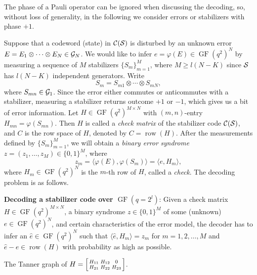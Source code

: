 \documentclass{ieeeaccess}
\DeclareMathOperator{\GF}{GF}
\DeclareMathOperator{\row}{row}
\newcommand{\sC}{{\cal C}}
\newcommand{\sG}{{\cal G}}
\newcommand{\sS}{{\cal S}}
\newcommand{\cS}{{\cal S}}
\let\emph\textit
\theoremstyle{definition}		%
\begin{document}
The phase of a Pauli operator can be ignored when discussing the decoding, so, without loss of generality, in the following we consider errors or stabilizers with phase $+1$.

Suppose that a codeword (state) in $\sC(\sS)$ is disturbed by an \mbox{unknown} error $E = E_1\otimes\cdots \otimes E_N\in\sG_N$.
We would like to infer $e = \varphi(E) \in\GF(q^2)^N$ by measuring 
a sequence of $M$ stabilizers  $\{S_m\}_{m=1}^M$, where $M\ge l(N-K)$ since $\cS$ has $l(N-K)$ independent generators. 
Write 
\begin{equation} \label{eq:S_m}
S_m = S_{m1} \otimes \cdots \otimes S_{mN},
\end{equation}
where $S_{mn}\in\sG_1$.
%
Since the error either commutes or anticommutes with a stabilizer, measuring a stabilizer returns outcome $+1$ or $-1$, which gives us a bit of error information. 
Let $H\in\GF(q^2)^{M\times N}$ with $(m,n)$-entry $H_{mn} = \varphi(S_{mn})$. 
Then $H$ is called a \emph{check matrix} of the stabilizer code $\sC(\sS)$, and $C$ is the row space of $H$, denoted by $C=\row(H)$.
After the measurements defined by $\{S_m\}_{m=1}^M$, we will obtain a \emph{binary error syndrome} $z = (z_1,\dots,z_M) \in\{0,1\}^M$, where
\begin{equation} \label{eq:zm}
z_m = \langle \varphi(E), \varphi(S_m) \rangle = \langle e, H_m \rangle,  
\end{equation}
where $H_m\in\GF(q^2)^N$ is the $m$-th row of $H$, called a \emph{check}. 
The decoding problem is as follows. %

\vspace*{4pt}
{\bf Decoding a stabilizer code over $\GF(q=2^l)$}:
Given a check matrix $H\in\GF(q^2)^{M\times N}$, a binary syndrome $z\in\{0,1\}^M$ of some (unknown) $e\in\GF(q^2)^N$, and certain characteristics of the error model, 
the decoder has to infer an $\hat e\in\GF(q^2)^N$ such that $\langle \hat e, H_m \rangle = z_m$ for $m=1,2,\dots,M$ and $\hat e - e \in \row(H)$ 
 with  probability as high as possible.
\vspace*{4pt}


{The Tanner graph of $H = \left[ {H_{11}\atop H_{21}} {H_{12}\atop H_{22}} {0\atop H_{23}} \right]$.\label{fig:H_2x3}}
\end{document}
